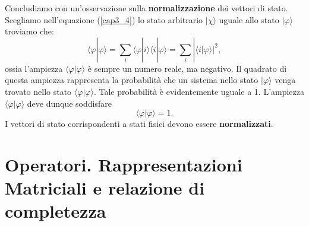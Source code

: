 \documentclass[a4paper,12pt,oneside]{book}
\begin{document}
Concludiamo con un'osservazione sulla \textbf{normalizzazione} dei vettori di stato. Scegliamo nell'equazione (\ref{cap3_4}) lo stato arbitrario $| \chi \rangle$ uguale allo stato $| \varphi \rangle$ troviamo che:
	\begin{equation}
		\langle \varphi | \varphi \rangle = \sum \limits_{i} \langle \varphi | i \rangle \langle i | \varphi \rangle = \sum \limits_{i} |\langle i | \varphi \rangle |^2 ,
	\end{equation}
ossia l'ampiezza $\langle \varphi| \varphi \rangle$ è sempre un numero reale, ma negativo. Il quadrato di questa ampiezza rappresenta la probabilità che un sistema nello stato $| \varphi \rangle$ venga trovato nello stato $\langle \varphi | \varphi \rangle $. Tale probabilità è evidentemente uguale a 1. L'ampiezza $\langle \varphi| \varphi \rangle$ deve dunque soddisfare
	\begin{equation}
		\langle \varphi| \varphi \rangle =1 .
	\end{equation}
I vettori di stato corrispondenti a stati fisici devono essere \textbf{normalizzati}.

\section[Operatori]{Operatori. Rappresentazioni Matriciali e relazione di completezza}
\end{document}
